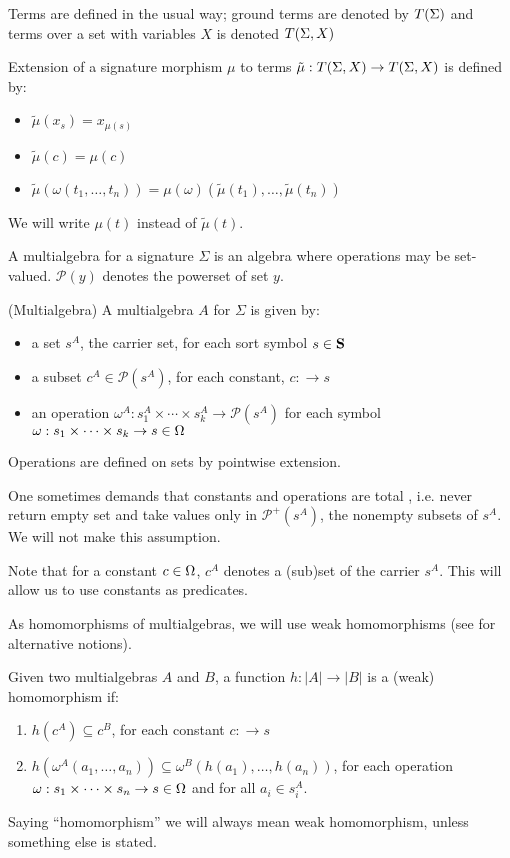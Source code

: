 \documentclass[10pt]{article}
\begin{document}
Terms are defined in the usual way; ground terms are denoted by $T(\Sigma)$ and terms over a set with variables $X$ is denoted $T(\Sigma,X)$
\begin{definition} Extension of a
signature morphism $\mu$ to terms ${\tilde{\mu}} : T(\Sigma,X) \to T(\Sigma,X)$ is defined by:
\begin{itemize}\MyLPar
\item ${\tilde{\mu}} (x_s) = x_{\mu (s)}$
\item ${\tilde{\mu}} (c) = \mu(c)$
\item ${\tilde{\mu}} (\omega(t_1, \ldots ,t_n )) = \mu(\omega)({\tilde{\mu}}(t_1), \ldots , {\tilde{\mu}}(t_n))$
\end{itemize}
\end{definition}
We will write $\mu(t)$
instead of ${\tilde{\mu}}(t)$.

A multialgebra for a signature $\Sigma$ is an algebra where operations may be
set-valued. ${\mathcal{P}}(y)$ denotes the powerset of set $y$.

\begin{definition}\label{def:ma}
(Multialgebra) A multialgebra $A$ for $\Sigma$ is given by:
\begin{itemize}
\item  a set $s^A$, the carrier set, for each sort symbol $s\in{\bf S}$
\item  a subset $ c^A \in {\mathcal{P}}(s^A)$, for each constant, $c:\to s$
\item an operation $\omega^A : s_1^A \times \cdots \times s_k^A \to {\mathcal{P}}(s^A)$
	for each symbol $\omega : s_1\times\cdots\times s_k \to s \in \Omega$
\end{itemize}
Operations are defined on sets by pointwise extension.
\end{definition}
One sometimes demands that constants and operations are total
\cite{calc,toplas}, i.e. never return empty set and take values only in
${\mathcal{P}}^+(s^A)$, the nonempty subsets of $s^A$. We will not make this
assumption.%

Note that for a constant $c \in \Omega$, $c^A$ denotes a (sub)set of the
carrier $s^A$. This will allow us to use constants  as predicates. 

As homomorphisms of multialgebras, we will use weak homomorphisms (see
\cite{catrel} for alternative notions).
\begin{definition}Given two multialgebras $A$ and $B$, 
a function $h: |A| \to |B|$ is a (weak) homomorphism if:
\begin{enumerate}
\item $h(c^A) \subseteq c^B$, for each constant $c: \to s$ 
\item $h(\omega^A(a_1, \ldots ,a_n)) \subseteq\omega^B(h(a_1), \ldots ,h(a_n))$,
for each operation  $\omega:s_1\times\cdots\times s_n\to s\in\Omega$ and for all $a_i \in s_{i}^A$.
\end{enumerate}
\end{definition}
Saying ``homomorphism'' we will always mean weak homomorphism, unless
something else is stated.
\end{document}
